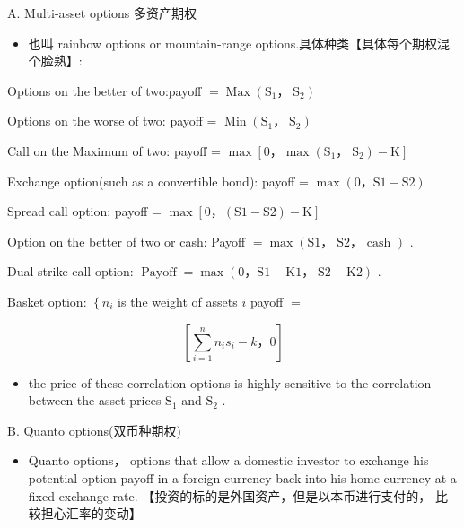 A. Multi-asset options 多资产期权

\begin{itemize}
\item 也叫 rainbow options or mountain-range options.具体种类【具体每个期权混个脸熟】:
\end{itemize}

Options on the better of two:payoff \(= \operatorname{Max}\left( {{\mathrm{S}}_{1}，{\mathrm{\;S}}_{2}}\right)\)

Options on the worse of two: payoff = \(\operatorname{Min}\left( {{\mathrm{S}}_{1}，{\mathrm{\;S}}_{2}}\right)\)

Call on the Maximum of two: payoff = \(\max \left\lbrack  {0，\max \left( {{\mathrm{S}}_{1}，{\mathrm{\;S}}_{2}}\right)  - \mathrm{K}}\right\rbrack\)

Exchange option(such as a convertible bond): payoff = \(\max \left( {0，\mathrm{S}1 - \mathrm{S}2}\right)\)

Spread call option: payoff = \(\max \left\lbrack  {0，\left( {\mathrm{S}1 - \mathrm{S}2}\right)  - \mathrm{K}}\right\rbrack\)

Option on the better of two or cash: Payoff \(= \max \left( {\mathrm{S}1，\mathrm{\;S}2，\text{ cash }}\right)\) .

Dual strike call option: \(\operatorname{Payoff} = \max \left( {0，\mathrm{S}1 - \mathrm{K}1，\mathrm{\;S}2 - \mathrm{K}2}\right)\) .

Basket option: \(\left\{  {n}_{i}\right.\) is the weight of assets \(i\)  payoff \(=\)

\[
\left\lbrack  {\mathop{\sum }\limits_{{i = 1}}^{n}{n}_{i}{s}_{i} - k，0}\right\rbrack
\]

\begin{itemize}
\item the price of these correlation options is highly sensitive to the correlation between the asset prices \({\mathrm{S}}_{1}\) and \({\mathrm{S}}_{2}\) .
\end{itemize}

B. Quanto options(双币种期权)

\begin{itemize}
\item Quanto options， options that allow a domestic investor to exchange his potential option payoff in a foreign currency back into his home currency at a fixed exchange rate. 【投资的标的是外国资产，但是以本币进行支付的， 比较担心汇率的变动】
\end{itemize}

